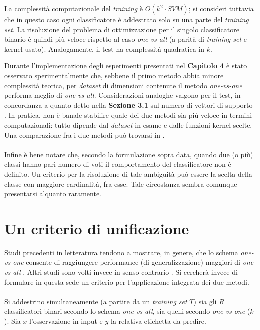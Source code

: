 La complessità computazionale del \textit{training} è $O(k^2 \cdot SVM)$; si consideri tuttavia che in questo caso ogni classificatore è addestrato solo su una parte del \textit{training set}. La risoluzione del problema di ottimizzazione per il singolo classificatore binario è quindi più veloce rispetto al caso \textit{one-vs-all} (a parità di \textit{training set} e kernel usato). Analogamente, il test ha complessità quadratica in $k$.

Durante l'implementazione degli esperimenti presentati nel \textbf{Capitolo 4} è stato osservato sperimentalmente che, sebbene il primo metodo abbia minore complessità teorica, per \textit{dataset} di dimensioni contenute il metodo \textit{one-vs-one} performa meglio di \textit{one-vs-all}.
Considerazioni analoghe valgono per il test, in concordanza a quanto detto nella \textbf{Sezione 3.1} sul numero di vettori di supporto \cite{comparison}.
In pratica, non è banale stabilire quale dei due metodi sia più veloce in termini computazionali: tutto dipende dal \textit{dataset} in esame e dalle funzioni kernel scelte. Una comparazione fra i due metodi può trovarsi in \cite{comparison}.

\paragraph{}
Infine è bene notare che, secondo la formulazione sopra data, quando due (o più) classi hanno pari numero di voti il comportamento del classificatore non è definito. Un criterio per la risoluzione di tale ambiguità può essere la scelta della classe con maggiore cardinalità, fra esse. Tale circostanza sembra comunque presentarsi alquanto raramente.

\section{Un criterio di unificazione}

Studi precedenti in letteratura tendono a mostrare, in genere, che lo schema \textit{one-vs-one} consente di raggiungere performance (di generalizzazione) maggiori di \textit{one-vs-all} \cite{4ovo}. Altri studi sono volti invece in senso contrario \cite{defense}. Si cercherà invece di formulare in questa sede un criterio per l'applicazione integrata dei due metodi.

\paragraph{}
Si addestrino simultaneamente (a partire da un \textit{training set} $T$) sia gli $R$ classificatori binari secondo lo schema \textit{one-vs-all}, sia quelli secondo \textit{one-vs-one} ($k$).
Sia $x$ l'osservazione in input e $y$ la relativa etichetta da predire.

